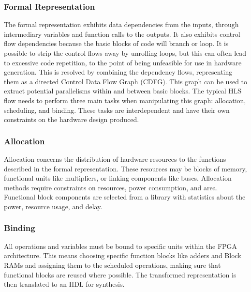 \subsubsection{Formal Representation}
The formal representation exhibits data dependencies from the inputs, through intermediary variables and function calls to the outputs. It also exhibits control flow dependencies because the basic blocks of code will branch or loop. It is possible to strip the control flows away by unrolling loops, but this can often lead to excessive code repetition, to the point of being unfeasible for use in hardware generation. This is resolved by combining the dependency flows, representing them as a directed Control Data Flow Graph (CDFG). This graph can be used to extract potential parallelisms within and between basic blocks. The typical HLS flow needs to perform three main tasks when manipulating this graph: allocation, scheduling, and binding. These tasks are interdependent and have their own constraints on the hardware design produced.
 
\subsubsection{Allocation}
Allocation concerns the distribution of hardware resources to the functions described in the formal representation. These resources may be blocks of memory, functional units like multipliers, or linking components like buses. Allocation methods require constraints on resources, power consumption, and area. Functional block components are selected from a library with statistics about the power, resource usage, and delay. 

\subsubsection{Binding} 
All operations and variables must be bound to specific units within the FPGA architecture. This means choosing specific function blocks like adders and Block RAMs and assigning them to the scheduled operations, making sure that functional blocks are reused where possible. The transformed representation is then translated to an HDL for synthesis.

\pagebreak
 
